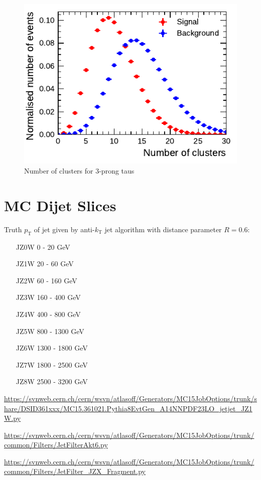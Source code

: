 \begin{figure}[htpb]
  \centering
  \includegraphics{./figures/rnn/ncls_3p.pdf}
  \caption{Number of clusters for 3-prong taus}
  \label{fig:total_clusters_3p}
\end{figure}

\section{MC Dijet Slices}
Truth $p_\mathrm{T}$ of jet given by anti-$k_\mathrm{T}$ jet algorithm with distance parameter $R=0.6$:
\begin{itemize}
\item[JZ0W] 0 - 20 GeV
\item[JZ1W] 20 - 60 GeV
\item[JZ2W] 60 - 160 GeV
\item[JZ3W] 160 - 400 GeV
\item[JZ4W] 400 - 800 GeV
\item[JZ5W] 800 - 1300 GeV
\item[JZ6W] 1300 - 1800 GeV
\item[JZ7W] 1800 - 2500 GeV
\item[JZ8W] 2500 - 3200 GeV
\end{itemize}

\url{https://svnweb.cern.ch/cern/wsvn/atlasoff/Generators/MC15JobOptions/trunk/share/DSID361xxx/MC15.361021.Pythia8EvtGen_A14NNPDF23LO_jetjet_JZ1W.py}


\url{https://svnweb.cern.ch/cern/wsvn/atlasoff/Generators/MC15JobOptions/trunk/common/Filters/JetFilterAkt6.py}


\url{https://svnweb.cern.ch/cern/wsvn/atlasoff/Generators/MC15JobOptions/trunk/common/Filters/JetFilter_JZX_Fragment.py}

